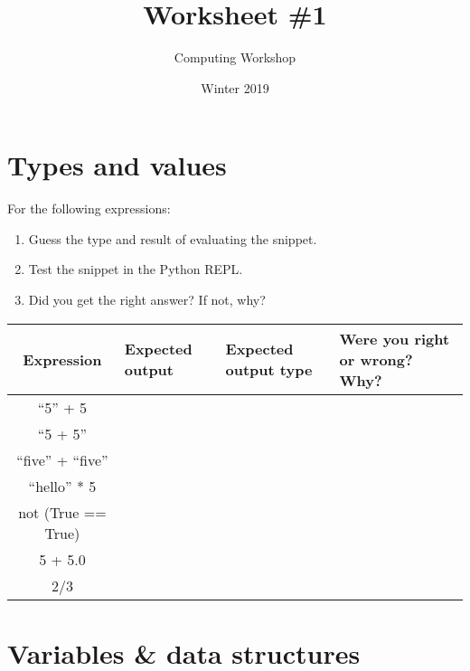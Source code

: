 \documentclass[11pt]{article}
\author{Computing Workshop}
\title{Worksheet \#1}
\date{Winter 2019}
\begin{document}
\maketitle

\section*{Types and values}

For the following expressions:
\begin{enumerate}
  \item
    Guess the type and result of evaluating the snippet.
  \item
    Test the snippet in the Python REPL.
  \item
    Did you get the right answer? If not, why?
\end{enumerate}

\begin{center}
\renewcommand{\arraystretch}{3.5}
\begin{tabular}{| c | p{5em}| p{5em} | p{21em} |}
    \hline %
    \textbf{Expression} & \textbf{Expected output}
    & \textbf{Expected output type} & \textbf{Were you right or wrong? Why?} \\ \hline
    ``5'' + 5 & ~ & ~ & ~ \\ \hline
    ``5 + 5'' & ~ & ~ & ~ \\ \hline
    ``five'' + ``five'' & ~ & ~ & ~ \\ \hline
    ``hello'' * 5 & ~ & ~ & ~ \\ \hline
    not (True == True) & ~ & ~ & ~ \\ \hline
    5 + 5.0 & ~ & ~ & ~ \\ \hline
    2/3 & ~ & ~ & ~ \\ \hline
\end{tabular}
\end{center}

\newpage

\section*{Variables \& data structures}
\end{document}
